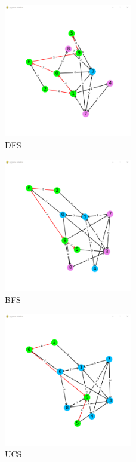 \begin{figure}[h!]
    \centering
    \includegraphics[width=0.5\textwidth]{result/testcase1/dfs.png}
    \caption{DFS}
\end{figure}
\begin{figure}[h!]
    \centering
    \includegraphics[width=0.5\textwidth]{result/testcase1/bfs.png}
    \caption{BFS}
\end{figure}
\begin{figure}[h!]
    \centering
    \includegraphics[width=0.5\textwidth]{result/testcase1/ucs.png}
    \caption{UCS}  
\end{figure}
